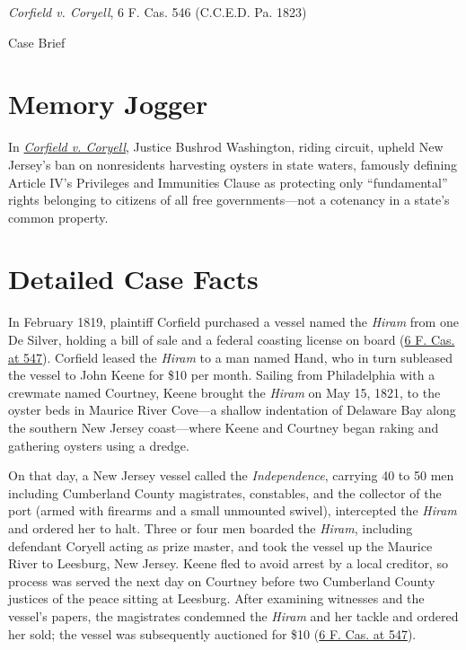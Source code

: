 \documentclass[12pt]{article}
\begin{document}
\begin{center}
{\LARGE \textit{Corfield v. Coryell}, 6 F. Cas. 546 (C.C.E.D. Pa. 1823)\par}
\vspace{0.8em}
{\large Case Brief\par}
\end{center}
\vspace{1em}

\section{Memory Jogger}

In \href{https://www.courtlistener.com/opinion/9306338/corfield-v-coryell/}{\textit{Corfield v. Coryell}}, Justice Bushrod Washington, riding circuit, upheld New Jersey's ban on nonresidents harvesting oysters in state waters, famously defining Article IV's Privileges and Immunities Clause as protecting only ``fundamental'' rights belonging to citizens of all free governments---not a cotenancy in a state's common property.

\section{Detailed Case Facts}

In February 1819, plaintiff Corfield purchased a vessel named the \textit{Hiram} from one De Silver, holding a bill of sale and a federal coasting license on board (\href{https://opencasebook.org/casebooks/4501-constitutional-law/resources/12.6-corfield-v-coryell/}{6 F. Cas. at 547}). Corfield leased the \textit{Hiram} to a man named Hand, who in turn subleased the vessel to John Keene for \$10 per month. Sailing from Philadelphia with a crewmate named Courtney, Keene brought the \textit{Hiram} on May 15, 1821, to the oyster beds in Maurice River Cove---a shallow indentation of Delaware Bay along the southern New Jersey coast---where Keene and Courtney began raking and gathering oysters using a dredge.

On that day, a New Jersey vessel called the \textit{Independence}, carrying 40 to 50 men including Cumberland County magistrates, constables, and the collector of the port (armed with firearms and a small unmounted swivel), intercepted the \textit{Hiram} and ordered her to halt. Three or four men boarded the \textit{Hiram}, including defendant Coryell acting as prize master, and took the vessel up the Maurice River to Leesburg, New Jersey. Keene fled to avoid arrest by a local creditor, so process was served the next day on Courtney before two Cumberland County justices of the peace sitting at Leesburg. After examining witnesses and the vessel's papers, the magistrates condemned the \textit{Hiram} and her tackle and ordered her sold; the vessel was subsequently auctioned for \$10 (\href{https://opencasebook.org/casebooks/4501-constitutional-law/resources/12.6-corfield-v-coryell/}{6 F. Cas. at 547}).
\end{document}
